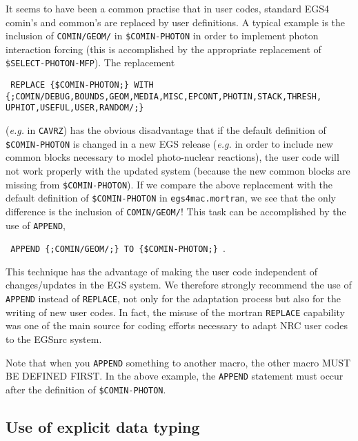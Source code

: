 It seems to have been a common practise that in user codes, standard 
EGS4 comin's and common's are replaced by user definitions. 
A typical example is the inclusion of {\tt COMIN/GEOM/} in 
{\tt \$COMIN-PHOTON} in order to implement photon interaction 
forcing (this is accomplished by the appropriate replacement 
of {\tt \$SELECT-PHOTON-MFP}). The replacement
\begin{flushleft}
{\tt
REPLACE \{\$COMIN-PHOTON;\} WITH\\
\{;COMIN/DEBUG,BOUNDS,GEOM,MEDIA,MISC,EPCONT,PHOTIN,STACK,THRESH,\\
\quad \quad UPHIOT,USEFUL,USER,RANDOM/;\} }
\end{flushleft}
({\em e.g.} in {\tt CAVRZ}) has the obvious disadvantage that if 
the default definition of {\tt \$COMIN-PHOTON} is changed 
in a new EGS release 
({\em e.g.} in order to include new common blocks necessary 
to model photo-nuclear reactions), the user code will not work 
properly with the updated system (because the new common blocks 
are missing from  {\tt \$COMIN-PHOTON}). If we compare the 
above replacement with the default definition of 
{\tt \$COMIN-PHOTON} in {\tt egs4mac.mortran}, we see that the only 
difference is the inclusion of {\tt COMIN/GEOM/}! This 
task can be accomplished by the use of {\tt APPEND},
\begin{flushleft}
{\tt
APPEND \{;COMIN/GEOM/;\} TO \{\$COMIN-PHOTON;\} }.
\end{flushleft}
This technique has the advantage of making the user code 
independent of changes/updates in the EGS system. 
We therefore strongly recommend the use of {\tt APPEND} 
instead of {\tt REPLACE}, not only for the adaptation process but 
also for the writing of new user codes. In fact, the 
misuse of the mortran {\tt REPLACE} capability was one 
of the main source for coding efforts necessary to adapt 
NRC user codes to the EGSnrc system. 

Note that when you {\tt APPEND} something to another macro, the other macro
MUST BE DEFINED FIRST. In the above example, the {\tt APPEND} statement must
occur after the definition of {\tt \$COMIN-PHOTON}.  

\subsection{Use of explicit data typing}
\label{implicit}

